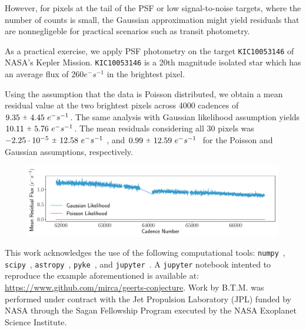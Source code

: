 \documentclass{rnaastex}
\newcommand{\rpm}{\sbox0{$1$}\sbox2{$\scriptstyle\pm$}
\raise\dimexpr(\ht0-\ht2)/2\relax\box2 }
\begin{document}
However, for pixels at the tail of the PSF or low signal-to-noise targets,
where the number of counts is small, the Gaussian approximation might
yield residuals that are nonnegligeble for practical scenarios such as transit
photometry.

As a practical exercise, we apply PSF photometry on the target
\texttt{KIC10053146} of NASA's Kepler Mission. \texttt{KIC10053146} is a
20th magnitude isolated star which has an average flux of $260 e^{-}s^{-1}$ in
the brightest pixel.

Using the assumption that the data is Poisson distributed, we obtain a mean
residual value at the two brightest pixels across 4000 cadences of
$9.35~\rpm~4.45~e^{-}s^{-1}$. The same analysis with Gaussian likelihood
assumption yields $10.11~\rpm~5.76~e^{-}s^{-1}$. The mean residuals
considering all 30 pixels was $-2.25\cdot 10^{-5}~\rpm~12.58~e^{-}s^{-1}~$,
and $0.99~\rpm~12.59~e^{-}s^{-1}~$ for the Poisson and Gaussian assumptions,
respectively.

\begin{figure}[!htb]
    \centering
    \includegraphics[scale=.5]{comparison.pdf}
\end{figure}

\acknowledgments This work acknowledges the use of the following computational
tools: \texttt{numpy}~\citep{numpy}, \texttt{scipy}~\citep{scipy},
\texttt{astropy}~\citep{astropy}, \texttt{pyke}~\citep{pyke},
and \texttt{jupyter}~\citep{jupyter}.
A \texttt{jupyter} notebook intented to reproduce the example aforementioned is
available at: \url{https://www.github.com/mirca/geerts-conjecture}.
Work by B.T.M. was performed under contract with the Jet Propulsion Laboratory (JPL) funded by 
NASA through the Sagan Fellowship Program executed by the NASA Exoplanet Science Institute.
\end{document}
